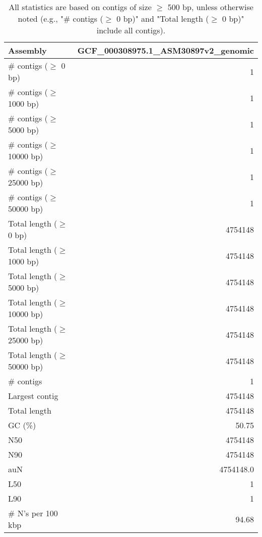 \documentclass[12pt,a4paper]{article}
\begin{document}
\begin{table}[ht]
\begin{center}
\caption{All statistics are based on contigs of size $\geq$ 500 bp, unless otherwise noted (e.g., "\# contigs ($\geq$ 0 bp)" and "Total length ($\geq$ 0 bp)" include all contigs).}
\begin{tabular}{|l*{1}{|r}|}
\hline
Assembly & GCF\_000308975.1\_ASM30897v2\_genomic \\ \hline
\# contigs ($\geq$ 0 bp) & 1 \\ \hline
\# contigs ($\geq$ 1000 bp) & 1 \\ \hline
\# contigs ($\geq$ 5000 bp) & 1 \\ \hline
\# contigs ($\geq$ 10000 bp) & 1 \\ \hline
\# contigs ($\geq$ 25000 bp) & 1 \\ \hline
\# contigs ($\geq$ 50000 bp) & 1 \\ \hline
Total length ($\geq$ 0 bp) & 4754148 \\ \hline
Total length ($\geq$ 1000 bp) & 4754148 \\ \hline
Total length ($\geq$ 5000 bp) & 4754148 \\ \hline
Total length ($\geq$ 10000 bp) & 4754148 \\ \hline
Total length ($\geq$ 25000 bp) & 4754148 \\ \hline
Total length ($\geq$ 50000 bp) & 4754148 \\ \hline
\# contigs & 1 \\ \hline
Largest contig & 4754148 \\ \hline
Total length & 4754148 \\ \hline
GC (\%) & 50.75 \\ \hline
N50 & 4754148 \\ \hline
N90 & 4754148 \\ \hline
auN & 4754148.0 \\ \hline
L50 & 1 \\ \hline
L90 & 1 \\ \hline
\# N's per 100 kbp & 94.68 \\ \hline
\end{tabular}
\end{center}
\end{table}
\end{document}

